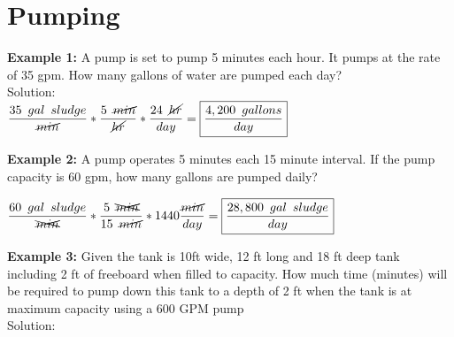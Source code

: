 \documentclass{article}
\begin{document}
\newpage
\section{Pumping}
\textbf{Example 1:}  A pump is set to pump 5 minutes each hour. It pumps at the rate of 35 gpm. How many gallons of water are pumped each day?\\
Solution:\\
$\dfrac{35 \enspace gal \enspace sludge}{\cancel{min}}*\dfrac{5 \enspace \cancel{min}}{\cancel{hr}} *\dfrac{24 \enspace \cancel{hr}}{day}=\boxed{\dfrac{4,200 \enspace gallons}{day}}$\\
\vspace{0.5cm}

\textbf{Example 2:}  A pump operates 5 minutes each 15 minute interval.  If the pump capacity is 60 gpm, how many gallons are pumped daily?

$\dfrac{60 \enspace gal \enspace sludge}{\xcancel{min}}*\dfrac{5 \enspace \xcancel{min}}{15 \enspace \cancel{min}}*1440\dfrac{\cancel{min}}{day}=\boxed{\dfrac {28,800 \enspace gal \enspace sludge }{day}}$\\
\vspace{0.5cm}

\textbf{Example 3:}  Given the tank is 10ft wide, 12 ft long and 18 ft deep tank including 2 ft of freeboard when filled to capacity. How much time (minutes) will be required to pump down this tank to a depth of 2 ft when the tank is at maximum capacity using a 600 GPM pump\\
Solution:\\
\vspace{0.5cm}
\end{document}
